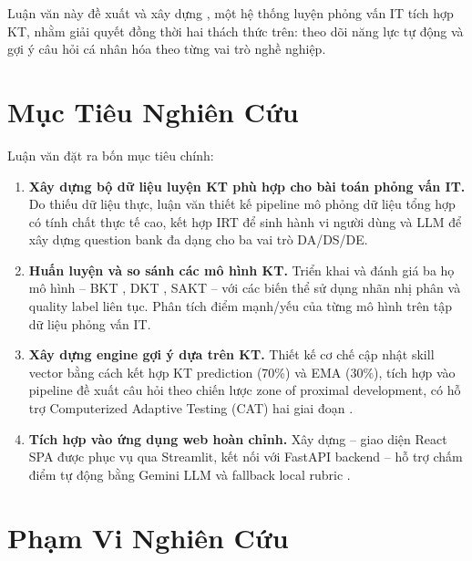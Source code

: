 Luận văn này đề xuất và xây dựng \system{}, một hệ thống luyện phỏng vấn IT tích hợp KT, nhằm giải quyết đồng thời hai thách thức trên: theo dõi năng lực tự động và gợi ý câu hỏi cá nhân hóa theo từng vai trò nghề nghiệp.

\section{Mục Tiêu Nghiên Cứu}
\label{sec:objectives}

Luận văn đặt ra bốn mục tiêu chính:

\begin{enumerate}
  \item \textbf{Xây dựng bộ dữ liệu luyện KT phù hợp cho bài toán phỏng vấn IT.} Do thiếu dữ liệu thực, luận văn thiết kế pipeline mô phỏng dữ liệu tổng hợp có tính chất thực tế cao, kết hợp IRT \cite{embretson2000item} để sinh hành vi người dùng và LLM để xây dựng question bank đa dạng cho ba vai trò DA/DS/DE.

  \item \textbf{Huấn luyện và so sánh các mô hình KT.} Triển khai và đánh giá ba họ mô hình -- BKT \cite{corbett1994knowledge}, DKT \cite{piech2015deep}, SAKT \cite{pandey2019self} -- với các biến thể sử dụng nhãn nhị phân và quality label liên tục. Phân tích điểm mạnh/yếu của từng mô hình trên tập dữ liệu phỏng vấn IT.

  \item \textbf{Xây dựng engine gợi ý dựa trên KT.} Thiết kế cơ chế cập nhật skill vector bằng cách kết hợp KT prediction (70\%) và EMA (30\%), tích hợp vào pipeline đề xuất câu hỏi theo chiến lược zone of proximal development, có hỗ trợ Computerized Adaptive Testing (CAT) hai giai đoạn \cite{wainer2000computerized}.

  \item \textbf{Tích hợp vào ứng dụng web hoàn chỉnh.} Xây dựng \system{} -- giao diện React SPA được phục vụ qua Streamlit, kết nối với FastAPI backend -- hỗ trợ chấm điểm tự động bằng Gemini LLM và fallback local rubric \cite{team2023gemini}.
\end{enumerate}

\section{Phạm Vi Nghiên Cứu}
\label{sec:scope}

